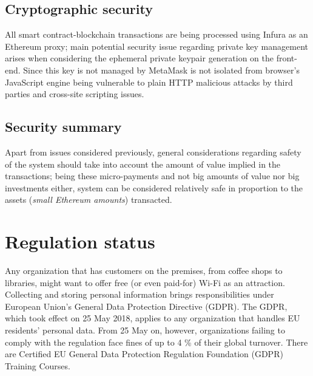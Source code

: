 \documentclass[12pt]{amsart}
\begin{document}
\begin{multicols}{2}
\subsection{Cryptographic security}

\vspace{0.35cm}

All smart contract-blockchain transactions are being processed
using Infura as an Ethereum proxy; main potential
security issue regarding
private key management arises when considering the ephemeral
private keypair generation on the front-end. Since this key
is not managed by MetaMask is not isolated from browser's
JavaScript engine being vulnerable to plain HTTP malicious
attacks by third parties and cross-site scripting issues.

\subsection{Security summary}

\vspace{0.35cm}

Apart from issues considered previously, general considerations
regarding safety of the system should take into account
the amount of value implied in the transactions;
being these micro-payments and not big amounts of value nor
big investments either, system can be considered relatively
safe in proportion to the assets (\textit{small Ethereum amounts})
transacted.

\section{Regulation status}
\vspace{0.35cm}

Any organization that has customers on the premises,
from coffee shops to libraries, might want to offer free (or even
paid-for) Wi-Fi as an attraction. Collecting and storing personal
information brings responsibilities under European Union’s General
Data Protection Directive (GDPR). The GDPR\cite{gdpr16}, which took
effect on 25 May 2018, applies to any organization that handles EU
residents’ personal data. From 25 May on, however, organizations
failing to comply with the regulation face fines of up to 4 \% of
their global turnover. There are Certified EU General Data Protection
Regulation Foundation (GDPR) Training Courses.

\vspace{0.35cm}


\end{multicols}
\end{document}
